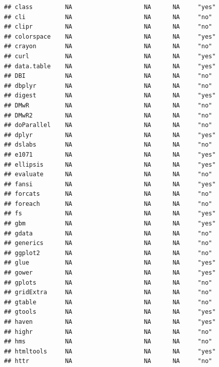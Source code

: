 \documentclass[]{article}
\begin{document}
\begin{verbatim}
## class         NA                    NA      NA     "yes"           
## cli           NA                    NA      NA     "no"            
## clipr         NA                    NA      NA     "no"            
## colorspace    NA                    NA      NA     "yes"           
## crayon        NA                    NA      NA     "no"            
## curl          NA                    NA      NA     "yes"           
## data.table    NA                    NA      NA     "yes"           
## DBI           NA                    NA      NA     "no"            
## dbplyr        NA                    NA      NA     "no"            
## digest        NA                    NA      NA     "yes"           
## DMwR          NA                    NA      NA     "no"            
## DMwR2         NA                    NA      NA     "no"            
## doParallel    NA                    NA      NA     "no"            
## dplyr         NA                    NA      NA     "yes"           
## dslabs        NA                    NA      NA     "no"            
## e1071         NA                    NA      NA     "yes"           
## ellipsis      NA                    NA      NA     "yes"           
## evaluate      NA                    NA      NA     "no"            
## fansi         NA                    NA      NA     "yes"           
## forcats       NA                    NA      NA     "no"            
## foreach       NA                    NA      NA     "no"            
## fs            NA                    NA      NA     "yes"           
## gbm           NA                    NA      NA     "yes"           
## gdata         NA                    NA      NA     "no"            
## generics      NA                    NA      NA     "no"            
## ggplot2       NA                    NA      NA     "no"            
## glue          NA                    NA      NA     "yes"           
## gower         NA                    NA      NA     "yes"           
## gplots        NA                    NA      NA     "no"            
## gridExtra     NA                    NA      NA     "no"            
## gtable        NA                    NA      NA     "no"            
## gtools        NA                    NA      NA     "yes"           
## haven         NA                    NA      NA     "yes"           
## highr         NA                    NA      NA     "no"            
## hms           NA                    NA      NA     "no"            
## htmltools     NA                    NA      NA     "yes"           
## httr          NA                    NA      NA     "no"            

\end{verbatim}
\end{document}
